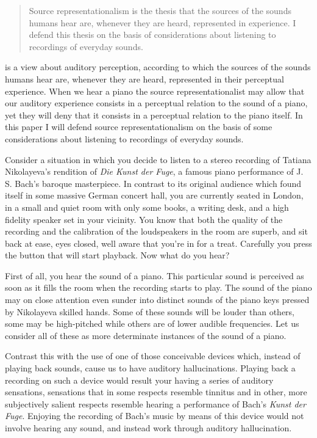 \documentclass[sloppy, journal, git, bytitle, dodraft]{humapap}
\begin{document}
\documenttitle

\begin{abstract}
Source representationalism is the thesis that the sources of the sounds humans hear are, whenever they are heard, represented in experience. I defend this thesis on the basis of considerations about listening to recordings of everyday sounds. 
\end{abstract}	

 is a view about auditory perception, according to which the sources of the sounds humans hear are, whenever they are heard, represented in their perceptual experience. When we hear a piano the source representationalist may allow that our auditory experience consists in a perceptual relation to the sound of a piano, yet they will deny that it consists in a perceptual relation to the piano itself. In this paper I will defend source representationalism on the basis of some considerations about listening to recordings of everyday sounds.

\sect Consider a situation in which you decide to listen to a stereo recording of Tatiana Nikolayeva's rendition of \emph{Die Kunst der Fuge}, a famous piano performance of J. S. Bach's baroque masterpiece. In contrast to its original audience which found itself in some massive German concert hall, you are currently seated in London, in a small and quiet room with only some books, a writing desk, and a high fidelity speaker set in your vicinity. You know that both the quality of the recording and the calibration of the loudspeakers in the room are superb, and sit back at ease, eyes closed, well aware that you're in for a treat. Carefully you press the button that will start playback. Now what do you hear? 

\sect First of all, you hear the sound of a piano. This particular sound is perceived as soon as it fills the room when the recording starts to play. The sound of the piano may on close attention even sunder into distinct sounds of the piano keys pressed by Nikolayeva skilled hands. Some of these sounds will be louder than others, some may be high-pitched while others are of lower audible frequencies. Let us consider all of these as more determinate instances of the sound of a piano.

Contrast this with the use of one of those conceivable devices which, instead of playing back sounds, cause us to have auditory hallucinations. Playing back a recording on such a device would result your having a series of auditory sensations, sensations that in some respects resemble tinnitus and in other, more subjectively salient respects resemble hearing a performance of Bach's \emph{Kunst der Fuge}. Enjoying the recording of Bach's music by means of this device would not involve hearing any sound, and instead work through auditory hallucination. 
\end{document}
